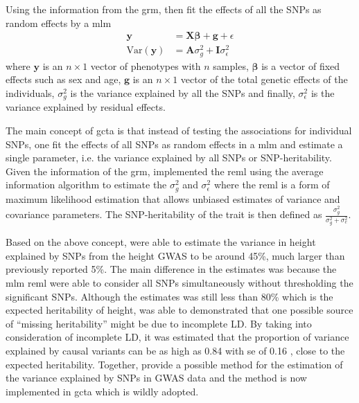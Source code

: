 \documentclass[12pt]{scrbook}
\begin{document}
	Using the information from the \gls{grm}, \citet{Yang2011} then fit the effects of all the \glspl{SNP} as random effects by a \gls{mlm}
	\begin{align}
	\boldsymbol{y} &= \boldsymbol{X\beta}+\boldsymbol{g}+\epsilon\\
	\mathrm{Var}(\boldsymbol{y}) &= \boldsymbol{A}\sigma_g^2+\boldsymbol{I}\sigma_\epsilon^2
	\end{align}
	where $\boldsymbol{y}$ is an $n\times 1$ vector of phenotypes with $n$ samples, $\boldsymbol{\beta}$ is a vector of fixed effects such as sex and age, $\boldsymbol{g}$ is an $n\times 1$ vector of the total genetic effects of the individuals, $\sigma_g^2$ is the variance explained by all the \glspl{SNP} and finally, $\sigma_\epsilon^2$ is the variance explained by residual effects.
	
	The main concept of \gls{gcta} is that instead of testing the associations for individual \glspl{SNP}, one fit the effects of all \glspl{SNP} as random effects in a \gls{mlm} and estimate a single parameter, i.e. the variance explained by all \glspl{SNP} or \gls{SNP}-heritability.
	Given the information of the \gls{grm}, \citet{Yang2011} implemented the \gls{reml} using the average information algorithm to estimate the $\sigma_g^2$ and $\sigma_\epsilon^2$ where the \gls{reml} is a form of maximum likelihood estimation that allows unbiased estimates of variance and covariance parameters.
	The \gls{SNP}-heritability of the trait is then defined as $\frac{\sigma_g^2}{\sigma_g^2+\sigma_e^2}$.
	
	Based on the above concept, \citet{Yang2010a} were able to estimate the variance in height explained by \glspl{SNP} from the height \gls{GWAS} to be around 45\%, much larger than previously reported 5\%.
	The main difference in the estimates was because the \gls{mlm} \gls{reml} were able to consider all \glspl{SNP} simultaneously without thresholding the significant \glspl{SNP}.
	Although the estimates was still less than 80\% which is the expected heritability of height, \citet{Yang2010a} was able to demonstrated that one possible source of ``missing heritability'' might be due to incomplete \gls{LD}.
	By taking into consideration of incomplete \gls{LD}, it was estimated that the proportion of variance explained by causal variants can be as high as 0.84 with \gls{se} of 0.16 \citep{Yang2010a}, close to the expected heritability.
	Together, \citet{Yang2011} provide a possible method for the estimation of the variance explained by \glspl{SNP} in \gls{GWAS} data and the method is now implemented in \gls{gcta} which is wildly adopted.
	
\end{document}

